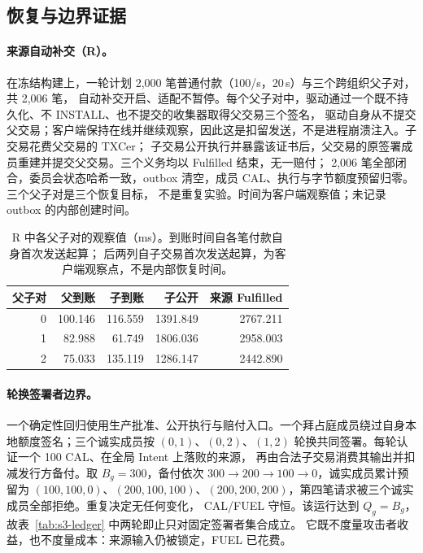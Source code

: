 \subsection{恢复与边界证据}
\paragraph{来源自动补交（R）。}
在冻结构建上，一轮计划 2,000 笔普通付款（100/s，20\,s）与三个跨组织父子对，共 2,006 笔，
自动补交开启、适配不暂停。每个父子对中，驱动通过一个既不持久化、不 INSTALL、也不提交的收集器取得父交易三个签名，
驱动自身从不提交父交易；客户端保持在线并继续观察，因此这是扣留发送，不是进程崩溃注入。子交易花费父交易的 TXCer；
子交易公开执行并暴露该证书后，父交易的原签署成员重建并提交父交易。三个义务均以 Fulfilled 结束，无一赔付；
2,006 笔全部闭合，委员会状态哈希一致，outbox 清空，成员 CAL、执行与字节额度预留归零。三个父子对是三个恢复目标，
不是重复实验。时间为客户端观察值；未记录 outbox 的内部创建时间。

\begin{table}[htbp]
\caption{R 中各父子对的观察值（ms）。到账时间自各笔付款自身首次发送起算；
后两列自子交易首次发送起算，为客户端观察点，不是内部恢复时间。}
\label{tab:sup-r}
\centering\small
\begin{tabular}{@{}rrrrr@{}}
\hline
父子对 & 父到账 & 子到账 & 子公开 & 来源 Fulfilled \\
\hline
0 & 100.146 & 116.559 & 1391.849 & 2767.211 \\
1 &  82.988 &  61.749 & 1806.036 & 2958.003 \\
2 &  75.033 & 135.119 & 1286.147 & 2442.890 \\
\hline
\end{tabular}
\end{table}

\paragraph{轮换签署者边界。}
一个确定性回归使用生产批准、公开执行与赔付入口。一个拜占庭成员绕过自身本地额度签名；三个诚实成员按
$(0,1)$、$(0,2)$、$(1,2)$ 轮换共同签署。每轮认证一个 100 CAL、在全局 Intent 上落败的来源，
再由合法子交易消费其输出并扣减发行方备付。取 $B_g=300$，备付依次 $300\to200\to100\to0$，诚实成员累计预留为
$(100,100,0)$、$(200,100,100)$、$(200,200,200)$，第四笔请求被三个诚实成员全部拒绝。重复决定无任何变化，
CAL/FUEL 守恒。该运行达到 $Q_g=B_g$，故表~\ref{tab:s3-ledger} 中两轮即止只对固定签署者集合成立。
它既不度量攻击者收益，也不度量成本：来源输入仍被锁定，FUEL 已花费。

